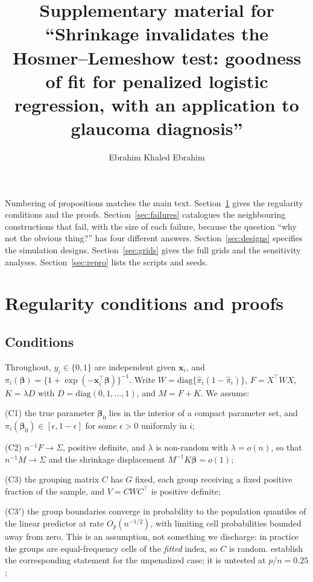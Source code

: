\documentclass[11pt,a4paper]{article}
\title{\bfseries Supplementary material for\\
``Shrinkage invalidates the Hosmer--Lemeshow test: goodness of fit for penalized
logistic regression, with an application to glaucoma diagnosis''}
\author{Ebrahim Khaled Ebrahim}
\date{}
\newcommand{\bb}{\boldsymbol{\beta}}
\theoremstyle{plain}
\theoremstyle{remark}
\begin{document}
\maketitle

\noindent
Numbering of propositions matches the main text. Section~\ref{sec:proofs} gives the
regularity conditions and the proofs. Section~\ref{sec:failures} catalogues the
neighbouring constructions that fail, with the size of each failure, because the
question ``why not the obvious thing?'' has four different answers.
Section~\ref{sec:designs} specifies the simulation designs.
Section~\ref{sec:grids} gives the full grids and the sensitivity analyses.
Section~\ref{sec:repro} lists the scripts and seeds.

\tableofcontents


\section{Regularity conditions and proofs}\label{sec:proofs}

\subsection{Conditions}\label{sec:conditions}

Throughout, $y_i \in \{0,1\}$ are independent given $\boldsymbol{x}_i$, and
$\pi_i(\bb) = \{1+\exp(-\boldsymbol{x}_i^{\top}\bb)\}^{-1}$. Write
$W = \mathrm{diag}\{\hat\pi_i(1-\hat\pi_i)\}$, $F = X^{\top}WX$, $K = \lambda D$ with
$D = \mathrm{diag}(0,1,\dots,1)$, and $M = F+K$. We assume:

(C1) the true parameter $\bb_0$ lies in the interior of a compact parameter set, and
$\pi_i(\bb_0) \in [\epsilon, 1-\epsilon]$ for some $\epsilon > 0$ uniformly in $i$;

(C2) $n^{-1}F \to \Sigma$, positive definite, and $\lambda$ is non-random with
$\lambda = o(n)$, so that $n^{-1}M \to \Sigma$ and the shrinkage displacement
$M^{-1}K\bb = o(1)$;

(C3) the grouping matrix $C$ has $G$ fixed, each group receiving a fixed positive
fraction of the sample, and $V = CWC^{\top}$ is positive definite;

(C3$'$) the group boundaries converge in probability to the population quantiles of the
linear predictor at rate $O_p(n^{-1/2})$, with limiting cell probabilities bounded away
from zero. This is an assumption, not something we discharge: in practice the groups are
equal-frequency cells of the \emph{fitted} index, so $C$ is random. \citet{moore1975}
establish the corresponding statement for the unpenalized case; it is untested at
$p/n = 0.25$;
\end{document}
